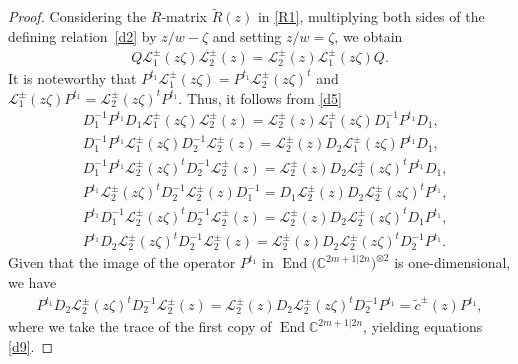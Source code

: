 \documentclass[10pt,a4paper]{amsart}
\numberwithin{equation}{section}
\begin{document}
\begin{proof}{Considering the $R$-matrix $\widetilde{R}(z)$ in \eqref{R1},}
multiplying both sides of the defining relation~\eqref{d2} by $z/w-\zeta$ and setting $z/w=\zeta$, we obtain
\begin{gather*}
Q\mathcal{L}_1^{\pm}(z\zeta)\mathcal{L}_2^{\pm}(z)=\mathcal{L}_2^{\pm}(z)\mathcal{L}_1^{\pm}(z\zeta)Q.
\end{gather*}
It is noteworthy that $P^{t_1}\mathcal{L}_1^{\pm}(z\zeta)=P^{t_1}\mathcal{L}_2^{\pm}(z\zeta)^t$ and $\mathcal{L}_1^{\pm}(z\zeta)P^{t_1}=\mathcal{L}_2^{\pm}(z\zeta)^tP^{t_1}$.
Thus, it follows from \eqref{d5}
\begin{align*}
 &D_1^{-1}P^{t_1}D_1\mathcal{L}_1^{\pm}(z\zeta)\mathcal{L}_2^{\pm}(z)=\mathcal{L}_2^{\pm}(z)\mathcal{L}_1^{\pm}(z\zeta)D_1^{-1}P^{t_1}D_1,\\
 &D_1^{-1}P^{t_1}\mathcal{L}_1^{\pm}(z\zeta)D_2^{-1}\mathcal{L}_2^{\pm}(z)=\mathcal{L}_2^{\pm}(z)D_2\mathcal{L}_1^{\pm}(z\zeta)P^{t_1}D_1,\\
 &D_1^{-1}P^{t_1}\mathcal{L}_2^{\pm}(z\zeta)^tD_2^{-1}\mathcal{L}_2^{\pm}(z)=\mathcal{L}_2^{\pm}(z)D_2\mathcal{L}_2^{\pm}(z\zeta)^tP^{t_1}D_1,\\
 &P^{t_1}\mathcal{L}_2^{\pm}(z\zeta)^tD_2^{-1}\mathcal{L}_2^{\pm}(z)D_1^{-1}=D_1\mathcal{L}_2^{\pm}(z)D_2\mathcal{L}_2^{\pm}(z\zeta)^tP^{t_1},\\
 &P^{t_1}D_1^{-1}\mathcal{L}_2^{\pm}(z\zeta)^tD_2^{-1}\mathcal{L}_2^{\pm}(z)=\mathcal{L}_2^{\pm}(z)D_2\mathcal{L}_2^{\pm}(z\zeta)^tD_1P^{t_1},\\
 &P^{t_1}D_2\mathcal{L}_2^{\pm}(z\zeta)^tD_2^{-1}\mathcal{L}_2^{\pm}(z)=\mathcal{L}_2^{\pm}(z)D_2\mathcal{L}_2^{\pm}(z\zeta)^tD_2^{-1}P^{t_1}.
\end{align*}
Given that the image of the operator $P^{t_1}$ in $\operatorname{End}\bigl(\mathbb{C}^{2m+1|2n}\bigr)^{\otimes2}$ is one-dimensional, we have
\begin{gather*}
 P^{t_1}D_2\mathcal{L}_2^{\pm}(z\zeta)^tD_2^{-1}\mathcal{L}_2^{\pm}(z)=\mathcal{L}_2^{\pm}(z)D_2\mathcal{L}_2^{\pm}(z\zeta)^tD_2^{-1}P^{t_1}=\widetilde{c}^{\pm}(z)P^{t_1},
\end{gather*}
where we take the trace of the first copy of $\operatorname{End}\mathbb{C}^{2m+1|2n}$, yielding equations \eqref{d9}.


\end{proof}
\end{document}
